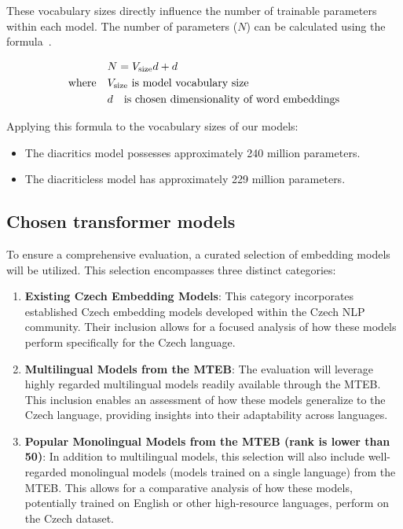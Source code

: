 These vocabulary sizes directly influence the number of trainable parameters within each model.
The number of parameters ($N$) can be calculated using the formula~.

\begin{align} \label{eq:cbow_parameters}
  & N = V_{\text{size}}d + d \\
  \text{where} \quad & V_{\text{size}} \text{ is model vocabulary size}  \notag \\
                      & d \quad \text{is chosen dimensionality of word embeddings} \notag
\end{align}
  
Applying this formula to the vocabulary sizes of our models:
\begin{itemize}
  \item The diacritics model possesses approximately 240 million parameters.
  \item The diacriticless model has approximately 229 million parameters.
\end{itemize}

\subsection{Chosen transformer models}
To ensure a comprehensive evaluation, a curated selection of embedding models will be utilized.
This selection encompasses three distinct categories:

\begin{enumerate}
  \item \textbf{Existing Czech Embedding Models}:
    This category incorporates established Czech embedding models developed within the Czech NLP community.
    Their inclusion allows for a focused analysis of how these models perform specifically for the Czech language.
  \item \textbf{Multilingual Models from the \ac{MTEB}}:
    The evaluation will leverage highly regarded multilingual models readily available through the \ac{MTEB}.
    This inclusion enables an assessment of how these models generalize to the Czech language, providing insights into their adaptability across languages.
  \item \textbf{Popular Monolingual Models from the \ac{MTEB} (rank is lower than 50)}:
    In addition to multilingual models, this selection will also include well-regarded monolingual models (models trained on a single language) from the \ac{MTEB}.
    This allows for a comparative analysis of how these models, potentially trained on English or other high-resource languages, perform on the Czech dataset.
\end{enumerate}

